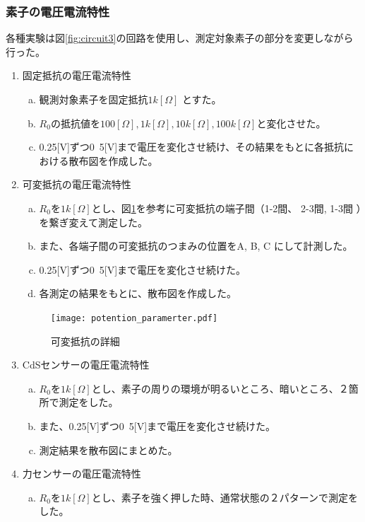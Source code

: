 \documentclass[11pt,dvipdfmx]{jarticle}
\begin{document}
	\subsubsection{素子の電圧電流特性}
	各種実験は図\ref{fig:circuit3}の回路を使用し、測定対象素子の部分を変更しながら行った。
		\begin{enumerate}[1.]
			\item 固定抵抗の電圧電流特性
				\begin{enumerate}[a.]
					\item 観測対象素子を固定抵抗$1k[\Omega]$ とすた。
					\item $R_0$の抵抗値を$100[\Omega], 1k[\Omega], 10k[\Omega], 100k[\Omega]$と変化させた。
					\item 0.25[V]ずつ0~5[V]まで電圧を変化させ続け、その結果をもとに各抵抗における散布図を作成した。
				\end{enumerate}
			\item 可変抵抗の電圧電流特性
				\begin{enumerate}[a.]
					\item $R_0を1k[\Omega]$とし、図\ref{fig:potention}を参考に可変抵抗の端子間（1-2間、 2-3間, 1-3間 ）を繋ぎ変えて測定した。
					\item また、各端子間の可変抵抗のつまみの位置をA, B, C にして計測した。
					\item 0.25[V]ずつ0~5[V]まで電圧を変化させ続けた。
					\item 各測定の結果をもとに、散布図を作成した。
				\end{enumerate}
				\begin{figure}[h]
					\centering
					\texttt{[image: potention\_paramerter.pdf]}
					\caption{可変抵抗の詳細}
					\label{fig:potention}
				\end{figure}
			\item CdSセンサーの電圧電流特性
				\begin{enumerate}[a.]
					\item $R_0を1k[\Omega]$とし、素子の周りの環境が明るいところ、暗いところ、２箇所で測定をした。
					\item また、0.25[V]ずつ0~5[V]まで電圧を変化させ続けた。
					\item 測定結果を散布図にまとめた。 
				\end{enumerate}
			\item 力センサーの電圧電流特性
				\begin{enumerate}[a.]
					\item $R_0を1k[\Omega]$とし、素子を強く押した時、通常状態の２パターンで測定をした。

\end{enumerate}
\end{enumerate}
\end{document}
